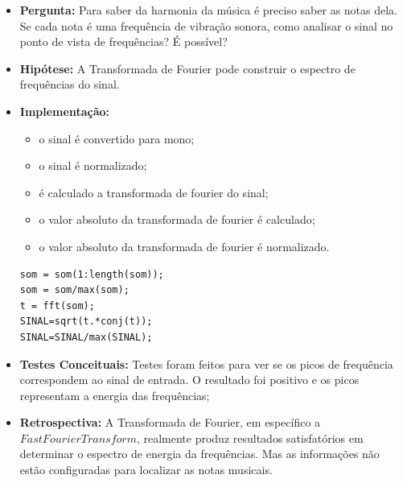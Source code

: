 \begin{itemize}
\item \textbf{Pergunta:} Para saber da harmonia da música é preciso saber as notas dela. Se cada nota é uma frequência de vibração sonora, como analisar o sinal no ponto de vista de frequências? É possível?
\item \textbf{Hipótese:} A Transformada de Fourier pode construir o espectro de frequências do sinal.
\item \textbf{Implementação:}
\begin{itemize} 
	\item o sinal é convertido para mono;
	\item o sinal é normalizado;
	\item é calculado a transformada de fourier do sinal;
	\item o valor absoluto da transformada de fourier é calculado;
	\item o valor absoluto da transformada de fourier é normalizado.
\end{itemize}
\begin{lstlisting}
som = som(1:length(som));
som = som/max(som);
t = fft(som);
SINAL=sqrt(t.*conj(t));
SINAL=SINAL/max(SINAL);
\end{lstlisting}
\item \textbf{Testes Conceituais:} Testes foram feitos para ver se os picos de frequência correspondem ao sinal de entrada. O resultado foi positivo e os picos representam a energia das frequências;
\item \textbf{Retrospectiva:} A Transformada de Fourier, em específico a $Fast Fourier Transform$, realmente produz resultados satisfatórios em determinar o espectro de energia da frequências. Mas as informações não estão configuradas para localizar as notas musicais.
\end{itemize}


